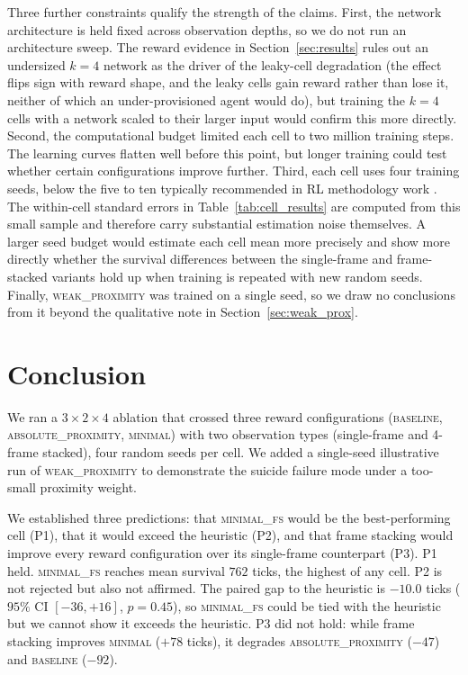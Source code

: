 \documentclass[12pt,a4paper,titlepage]{article}
\begin{document}
Three further constraints qualify the strength of the claims. First, the network architecture is held fixed across observation depths, so we do not run an architecture sweep. The reward evidence in Section~\ref{sec:results} rules out an undersized $k=4$ network as the driver of the leaky-cell degradation (the effect flips sign with reward shape, and the leaky cells gain reward rather than lose it, neither of which an under-provisioned agent would do), but training the $k=4$ cells with a network scaled to their larger input would confirm this more directly. Second, the computational budget limited each cell to two million training steps. The learning curves flatten well before this point, but longer training could test whether certain configurations improve further. Third, each cell uses four training seeds, below the five to ten typically recommended in RL methodology work \citep{Henderson2018, Colas2018}. The within-cell standard errors in Table~\ref{tab:cell_results} are computed from this small sample and therefore carry substantial estimation noise themselves. A larger seed budget would estimate each cell mean more precisely and show more directly whether the survival differences between the single-frame and frame-stacked variants hold up when training is repeated with new random seeds. Finally, \textsc{weak\_proximity} was trained on a single seed, so we draw no conclusions from it beyond the qualitative note in Section~\ref{sec:weak_prox}.

\section{Conclusion}
\label{sec:conclusion}

We ran a $3 \times 2 \times 4$ ablation that crossed three reward configurations (\textsc{baseline}, \textsc{absolute\_proximity}, \textsc{minimal}) with two observation types (single-frame and 4-frame stacked), four random seeds per cell. We added a single-seed illustrative run of \textsc{weak\_proximity} to demonstrate the suicide failure mode under a too-small proximity weight.

We established three predictions: that \textsc{minimal\_fs} would be the best-performing cell (P1), that it would exceed the heuristic (P2), and that frame stacking would improve every reward configuration over its single-frame counterpart (P3). P1 held. \textsc{minimal\_fs} reaches mean survival $762$ ticks, the highest of any cell. P2 is not rejected but also not affirmed. The paired gap to the heuristic is $-10.0$ ticks ($95\%$ CI $[-36, +16]$, $p = 0.45$), so \textsc{minimal\_fs} could be tied with the heuristic but we cannot show it exceeds the heuristic. P3 did not hold: while frame stacking improves \textsc{minimal} ($+78$ ticks), it degrades \textsc{absolute\_proximity} ($-47$) and \textsc{baseline} ($-92$). 
\end{document}
